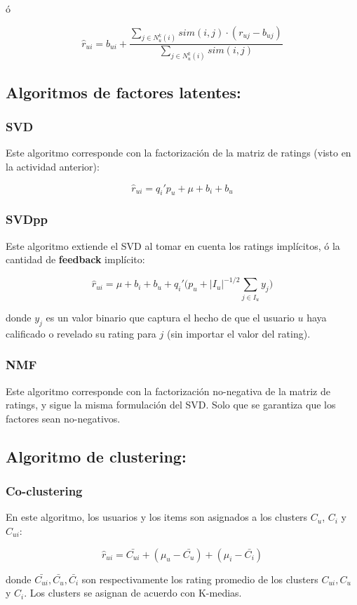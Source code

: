 \documentclass{article}
\begin{document}
ó

\begin{equation}
\hat r_{ui}=b_{ui} + \frac{\sum_{j\in N_u^k(i)}sim(i,j) \cdot (r_{uj}-b_{uj})}{\sum_{j\in N_u^k(i)}sim(i,j)}
\end{equation}

\subsection{Algoritmos de factores latentes:}

\subsubsection{SVD}

Este algoritmo corresponde con la factorización de la matriz de ratings (visto en la actividad anterior):

\begin{equation}
\hat r_{ui}=q_{i}'p_{u} + \mu + b_i + b_u
\end{equation}

\subsubsection{SVDpp}

Este algoritmo extiende el SVD al tomar en cuenta los ratings implícitos, ó la cantidad de \textbf{feedback} implícito:

\begin{equation}
\hat r_{ui}=\mu + b_i + b_u + q_{i}'\biggl(p_{u} + |I_u|^{-1/2} \sum_{j\in I_u} y_j \biggr)
\end{equation}

donde $y_j$ es un valor binario que captura el hecho de que el usuario $u$ haya calificado o revelado su rating para $j$ (sin importar el valor del rating).

\subsubsection{NMF}

Este algoritmo corresponde con la factorización no-negativa de la matriz de ratings, y sigue la misma formulación del SVD. Solo que se garantiza que los factores sean no-negativos.


\subsection{Algoritmo de clustering:}

\subsubsection{Co-clustering}

En este algoritmo, los usuarios y los items son asignados a los clusters $C_u$, $C_i$ y $C_{ui}$:

\begin{equation}
\hat r_{ui}=\bar{C_{ui}} + (\mu_u - \bar{C_u}) + (\mu_i - \bar{C_i})
\end{equation}

donde $\bar{C_{ui}}, \bar{C_u}, \bar{C_i}$ son respectivamente los rating promedio de los clusters $C_{ui}, C_u$ y $C_i$. Los clusters se asignan de acuerdo con K-medias.
\end{document}
